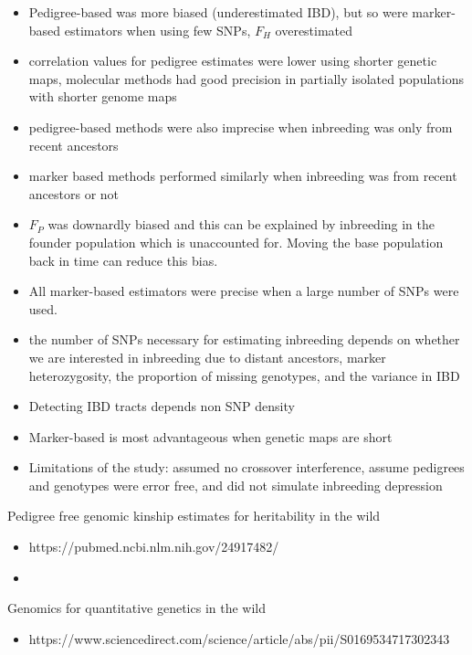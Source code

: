 \documentclass[12pt]{amsart}
\begin{document}
\begin{itemize}
\item Pedigree-based was more biased (underestimated IBD), but so were marker-based estimators when using few SNPs, $F_H$ overestimated
\item correlation values for pedigree estimates were lower using shorter genetic maps, molecular methods had good precision in partially isolated populations with shorter genome maps 
\item pedigree-based methods were also imprecise when inbreeding was only from recent ancestors
\item marker based methods performed similarly when inbreeding was from recent ancestors or not
\item $F_P$ was downardly biased and this can be explained by inbreeding in the founder population which is unaccounted for. Moving the base population back in time can reduce this bias.
\item All marker-based estimators were precise when a large number of SNPs were used. 
\item the number of SNPs necessary for estimating inbreeding depends on whether we are interested in inbreeding due to distant ancestors, marker heterozygosity, the proportion of missing genotypes, and the variance in IBD
\item Detecting IBD tracts depends non SNP density 
\item Marker-based is most advantageous when genetic maps are short
\item Limitations of the study: assumed no crossover interference, assume pedigrees and genotypes were error free, and did not simulate inbreeding depression  
\end{itemize}

{\large Pedigree free genomic kinship estimates for heritability in the wild}
\begin{itemize}
\item https://pubmed.ncbi.nlm.nih.gov/24917482/
\item 
\end{itemize}

 {\large Genomics for quantitative genetics in the wild}
\begin{itemize}
\item https://www.sciencedirect.com/science/article/abs/pii/S0169534717302343
\end{itemize}
\end{document}
